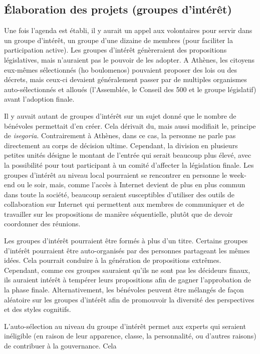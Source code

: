 \subsection{\'Elaboration des projets (groupes d'intérêt)}
Une fois l'agenda est établi, il y aurait un appel aux
volontaires pour servir dans un groupe d'intérêt, un groupe d'une
dizaine de membres (pour faciliter la participation active). Les
groupes d'intérêt génèreraient des propositions législatives, mais
n'auraient pas le pouvoir de les adopter. A Athènes, les citoyens
eux-mêmes sélectionnés (ho boulomenos) pouvaient proposer des lois ou
des décrets, mais ceux-ci devaient généralement passer par de multiples
organismes auto-sélectionnés et alloués (l'Assemblée, le Conseil des 500
et le groupe législatif) avant l'adoption finale.\par
Il y auvait autant de groupes d'intérêt sur un sujet donné
que le nombre de bénévoles permettait d'en créer. Cela dérivait
du, mais aussi modifiait le, principe de \emph{isegoria}. Contrairement à
Athènes, dans ce cas, la personne ne parle pas directement au corps
de décision ultime. Cependant, la division en plusieurs petites unités
désigne le montant de l'entrée qui serait beaucoup plus élevé, avec la
possibilité pour tout participant à un comité d'affecter la
législation finale. Les groupes d'intérêt au niveau local 
pourraient se rencontrer en personne le week-end ou le soir, mais, comme
l'accès à Internet devient de plus en plus commun dans toute la
société, beaucoup seraient susceptibles d'utiliser des outils de
collaboration sur Internet qui permettent aux membres de communiquer
et de travailler sur les propositions de manière séquentielle, plutôt
que de devoir coordonner des réunions.\par
Les groupes d'intérêt pourraient être formés à plus d'un titre.
Certains groupes d'intérêt pourraient être auto-organisés par  
des personnes partageant les mêmes idées. Cela pourrait conduire à la
génération de propositions extrêmes. Cependant, comme ces groupes
sauraient qu'ils ne sont pas les décideurs finaux, ils auraient intérêt
à tempérer leurs propositions afin de gagner l'approbation de la phase
finale. Alternativement, les bénévoles peuvent être mélangés de façon
aléatoire sur les groupes d'intérêt afin de promouvoir la diversité des
perspectives et des styles cognitifs. \par
L'auto-sélection au niveau du groupe d'intérêt permet aux experts qui
seraient inéligible (en raison de leur apparence, classe, la
personnalité, ou d'autres raisons) de contribuer à la gouvernance. Cela
